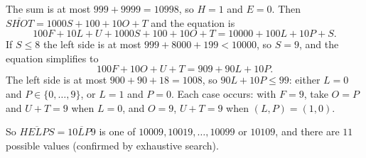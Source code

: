 The sum is at most $999+9999=10998$, so $H=1$ and $E=0$. Then $\overline{SHOT}=1000S+100+10O+T$ and the equation is
\[100F+10L+U+1000S+100+10O+T=10000+100L+10P+S.\]
If $S\le8$ the left side is at most $999+8000+199<10000$, so $S=9$, and the equation simplifies to
\[100F+10O+U+T=909+90L+10P.\]
The left side is at most $900+90+18=1008$, so $90L+10P\le99$: either $L=0$ and $P\in\{0,\dots,9\}$, or $L=1$ and $P=0$. Each case occurs: with $F=9$, take $O=P$ and $U+T=9$ when $L=0$, and $O=9$, $U+T=9$ when $(L,P)=(1,0)$.

So $\overline{HELPS}=\overline{10LP9}$ is one of $10009,10019,\dots,10099$ or $10109$, and there are $\boxed{11}$ possible values (confirmed by exhaustive search).
